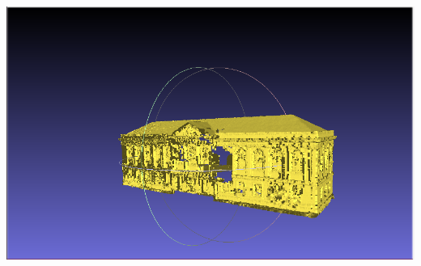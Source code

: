 \documentclass{article}
\begin{document}
\begin{center}
    \includegraphics[scale=0.20]{../../images/screen_kinetic/building.png} 
\end{center}
\end{document}
